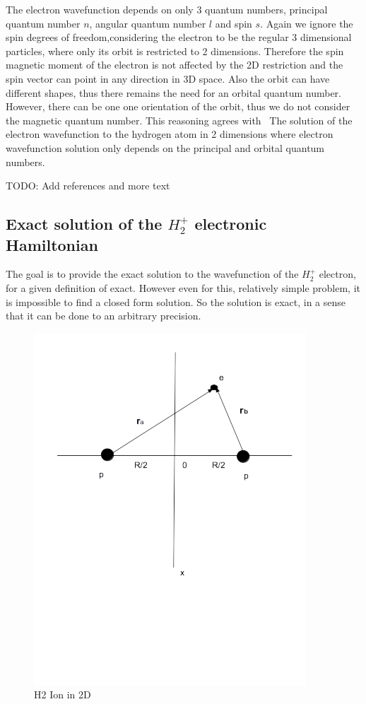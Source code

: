 The electron wavefunction depends on only 3 quantum numbers, principal quantum number $ n $, angular quantum number $ l $ and spin $ s $. Again we ignore the spin degrees of freedom,considering the electron to be the regular 3 dimensional particles, where only its orbit is restricted to 2 dimensions.  Therefore the spin magnetic moment of the electron is not affected by the 2D restriction and the spin vector can point in any direction in 3D space. Also the orbit can have different shapes, thus there remains the need for an orbital quantum number. However, there can be one one orientation of the orbit, thus we do not consider the magnetic quantum number. This reasoning agrees with ~The solution of the electron wavefunction to the hydrogen atom in 2 dimensions \cite{H2atom} where electron wavefunction solution only depends on the principal and orbital quantum numbers.

TODO: Add references and more text

\subsection{Exact solution of the  $ H_2^{+} $ electronic Hamiltonian}

The goal is to provide the exact solution to the wavefunction of the $ H_2^{+} $ electron, for a given definition of exact. However even for this, relatively simple problem, it is impossible to find a closed form solution. So the solution is exact, in a sense that it can be done to an arbitrary precision.

\begin{figure}
  \includegraphics{H2Ion2D.png}
  \caption{H2 Ion in 2D} \label{h2ion2d}
\end{figure}

